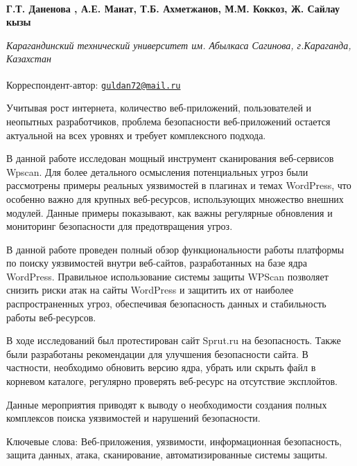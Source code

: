 
\begin{articleheader}

{\bfseries
Г.Т. Даненова\textsuperscript{\envelope } \authorid,
А.Е. Манат\authorid,
Т.Б. Ахметжанов\authorid,
М.М. Коккоз\authorid,
Ж. Сайлау кызы\authorid}
\end{articleheader}

\begin{affiliation}
\emph{Карагандинский технический университет им. Абылкаса Сагинова, г.Караганда, Казахстан}

\textsuperscript{\envelope }Корреспондент-автор: \href{mailto:guldan72@mail.ru}{\nolinkurl{guldan72@mail.ru}}
\end{affiliation}

Учитывая рост интернета, количество веб-приложений, пользователей и
неопытных разработчиков, проблема безопасности веб-приложений остается
актуальной на всех уровнях и требует комплексного подхода.

В данной работе исследован мощный инструмент сканирования веб-сервисов
Wpscan. Для более детального осмысления потенциальных угроз были
рассмотрены примеры реальных уязвимостей в плагинах и темах WordPress,
что особенно важно для крупных веб-ресурсов, использующих множество
внешних модулей. Данные примеры показывают, как важны регулярные
обновления и мониторинг безопасности для предотвращения угроз.

В данной работе проведен полный обзор функциональности работы платформы
по поиску уязвимостей внутри веб-сайтов, разработанных на базе ядра
WordPress. Правильное использование системы защиты WPScan позволяет
снизить риски атак на сайты WordPress и защитить их от наиболее
распространенных угроз, обеспечивая безопасность данных и стабильность
работы веб-ресурсов.

В ходе исследований был протестирован сайт Sprut.ru на безопасность.
Также были разработаны рекомендации для улучшения безопасности сайта. В
частности, необходимо обновить версию ядра, убрать или скрыть файл в
корневом каталоге, регулярно проверять веб-ресурс на отсутствие
эксплойтов.

Данные мероприятия приводят к выводу о необходимости создания полных
комплексов поиска уязвимостей и нарушений безопасности.

Ключевые слова: Веб-приложения, уязвимости, информационная безопасность,
защита данных, атака, сканирование, автоматизированные системы защиты.

